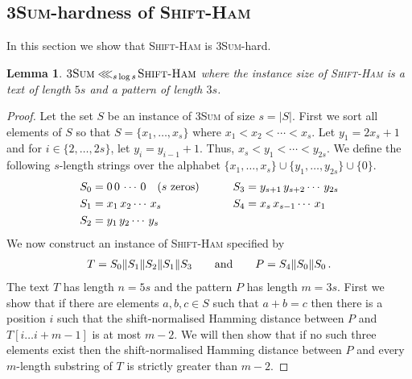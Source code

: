 \documentclass[11pt]{article}
\newcommand{\concat}{\|}
\newcommand{\upto}{\ldots}
\newcommand{\sHam}{\textsc{Shift-Ham}\xspace}
\newcommand{\threeSUM}{\textsc{3Sum}\xspace}
\newcommand{\freduce}[1]{\ensuremath{\lll_{#1}\!}}
\theoremstyle{plain}
\newtheorem{lemma}[theorem]{Lemma}
\theoremstyle{definition}
\begin{document}
\subsection{\threeSUM-hardness of \sHam}

In this section we show that \sHam is \threeSUM-hard.

\begin{lemma}
    \label{lem:sHamHard}
    $\threeSUM\freduce{s\log s}\sHam$ where the instance size of \sHam is a text of length $5s$ and a pattern of length $3s$.
\end{lemma}
\begin{proof}
    Let the set $S$ be an instance of \threeSUM of size $s=|S|$. First we sort all elements of $S$ so that $S=\{x_1,\dots,x_s\}$ where $x_1< x_2<\cdots< x_s$. Let $y_1=2x_s+1$ and for $i\in \{2,\dots,2s\}$, let $y_i=y_{i-1}+1$. Thus, $x_s<y_1<\cdots< y_{2s}$. We define the following $s$-length strings over the alphabet $\{x_1,\dots,x_s\}\cup\{y_1,\dots,y_{2s}\}\cup\{0\}$.
\begin{align*}
        S_0 &= 0 \, 0 \, \cdots \, 0 \quad \textup{($s$ zeros)} &\qquad S_3 &= y_{s+1} \, y_{s+2} \cdots \, y_{2s} \\
        S_1 &= x_1 \, x_2 \cdots \, x_s &\qquad S_4 &= x_s \, x_{s-1} \cdots \, x_1 \\
        S_2 &= y_1 \, y_2 \cdots \, y_s &\qquad ~
    \end{align*}
We now construct an instance of \sHam specified by
\begin{align*}
        T = S_0 \concat S_1 \concat S_2 \concat S_1 \concat S_3 \qquad \textup{and} \qquad
        P = S_4 \concat S_0 \concat S_0\,.
    \end{align*}
The text $T$ has length $n=5s$ and the pattern $P$ has length $m=3s$. First we show that if there are elements $a,b,c\in S$ such that $a+b=c$ then there is a position $i$ such that the shift-normalised Hamming distance between $P$ and $T[i\upto i+m-1]$ is at most $m-2$. We will then show that if no such three elements exist then the shift-normalised Hamming distance between $P$ and every $m$-length substring of $T$ is strictly greater than $m-2$.


\end{proof}
\end{document}
